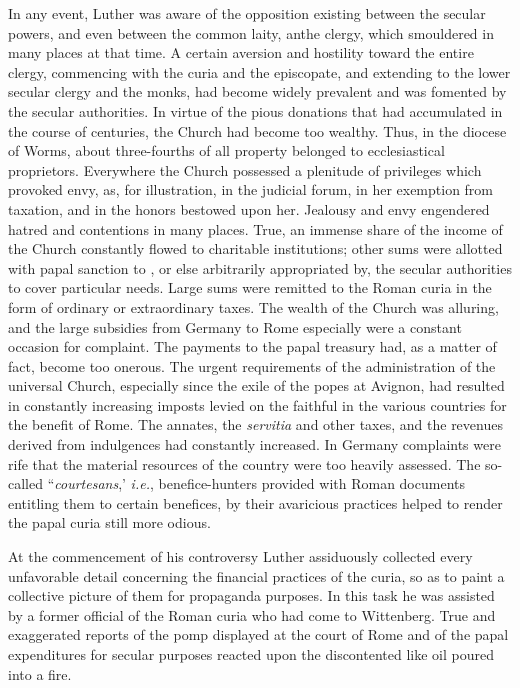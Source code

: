 In any event, Luther was aware of the opposition existing between the
secular powers, and even between the common laity, anthe clergy, which
smouldered in many places at that time. A certain
aversion and hostility toward the entire clergy, commencing with
the curia and the episcopate, and extending to the lower secular
clergy and the monks, had become widely prevalent and was fomented by
the secular authorities. In virtue of the pious donations
that had accumulated in the course of centuries, the Church had
become too wealthy. Thus, in the diocese of Worms, about three-fourths
of all property belonged to ecclesiastical proprietors. Everywhere the
Church possessed a plenitude of privileges which provoked
envy, as, for illustration, in the judicial forum, in her exemption
from taxation, and in the honors bestowed upon her. Jealousy and
envy engendered hatred and contentions in many places. True, an
immense share of the income of the Church constantly flowed to
charitable institutions; other sums were allotted with papal sanction to
, or else arbitrarily appropriated by, the secular authorities to
cover particular needs. Large sums were remitted to the Roman
curia in the form of ordinary or extraordinary taxes. The wealth of
the Church was alluring, and the large subsidies from Germany to
Rome especially were a constant occasion for complaint. The payments to
the papal treasury had, as a matter of fact, become too
onerous. The urgent requirements of the administration of the universal
Church, especially since the exile of the popes at Avignon,
had resulted in constantly increasing imposts levied on the faithful in
the various countries for the benefit of Rome. The annates,
the \textit{servitia} and other taxes, and the revenues derived from indulgences
had constantly increased. In Germany complaints were rife that
the material resources of the country were too heavily assessed. The
so-called “\textit{courtesans},’ \textit{i.e.}, benefice-hunters provided with Roman
documents entitling them to certain benefices, by their avaricious
practices helped to render the papal curia still more odious.

At the commencement of his controversy Luther assiduously collected
every unfavorable detail concerning the financial practices
of the curia, so as to paint a collective picture of them for propaganda
purposes. In this task he was assisted by a former official of the
Roman curia who had come to Wittenberg. True and exaggerated
reports of the pomp displayed at the court of Rome and of the papal
expenditures for secular purposes reacted upon the discontented
like oil poured into a fire.

